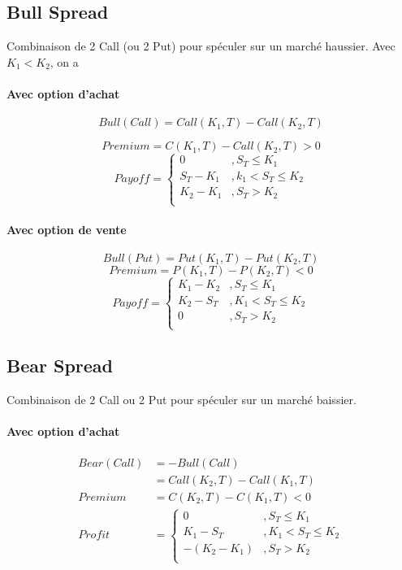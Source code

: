 \documentclass[10pt, french]{article}
\begin{document}
\begin{multicols*}{2}
\subsection*{Bull Spread}
Combinaison de 2 Call (ou 2 Put) pour spéculer sur un marché haussier. Avec $K_1 < K_2$, on a
\paragraph{Avec option d'achat}
\[Bull (Call) = Call(K_1, T) - Call(K_2, T) \]

\[Premium = C(K_1, T) - Call(K_2, T) > 0 \]
\[Payoff = 
\begin{cases}
0					& , S_T \leq K_1 \\
S_T - K_1		& , k_1 < S_T \leq K_2 \\
K_2 -K_1		& , S_T > K_2 \\
\end{cases}
\]
\paragraph{Avec option de vente}
\[Bull(Put) = Put(K_1, T) - Put(K_2,T) \]
\[Premium = P(K_1,T) - P(K_2, T) < 0\]
\[Payoff = 
\begin{cases}
K_1 - K_2 			& , S_T \leq K_1 \\
K_2 - S_T				& , K_1 < S_T \leq K_2 \\
0							& , S_T > K_2 \\
\end{cases}
\]




\subsection*{Bear Spread}
Combinaison de 2 Call ou 2 Put pour spéculer sur un marché baissier.
\paragraph{Avec option d'achat}
\begin{align*}
Bear(Call) & =  - Bull(Call) \\
& = Call(K_2, T) - Call(K_1, T) \\
Premium		& = 	 C(K_2,T) - C(K_1,T) < 0 \\
Profit	& = 
\begin{cases}
0					& , S_T \leq K_1 \\
K_1 - S_T 	& , K_1 < S_T \leq K_2 \\
-(K_2 - K_1)& , S_T > K_2 \\
\end{cases}
\end{align*}


\end{multicols*}
\end{document}
